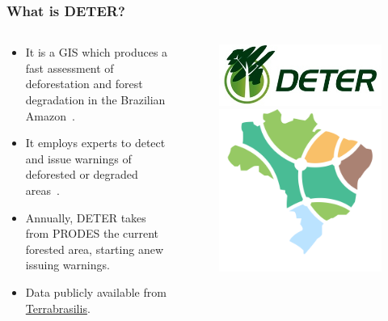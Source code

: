 \documentclass[aspectratio=169]{beamer}
\begin{document}
\begin{frame}
    \frametitle{What is DETER?}
    \begin{columns}
        \begin{column}{0.5\textwidth}
            \begin{itemize}
                \item It is a GIS which produces a fast assessment of deforestation 
                    and forest degradation in the Brazilian 
                    Amazon~\cite{shimabukuro2006}.
                \item It employs experts to detect and issue warnings of
                    deforested or degraded areas~\cite{dealmeida2022}.
                \item Annually, DETER takes from PRODES the current forested area, 
                    starting anew issuing warnings.
                \item Data publicly available from 
                    \href{https://terrabrasilis.dpi.inpe.br}{Terrabrasilis}.
            \end{itemize}
        \end{column}
        \begin{column}{0.5\textwidth}
            \begin{figure}[h]
                \includegraphics[width=0.99\linewidth]{./logos/deterblogo.jpg}
                \includegraphics[width=0.65\linewidth]{./logos/terrabrasilis.png}
            \end{figure}
        \end{column}
    \end{columns}
\end{frame}
\end{document}
